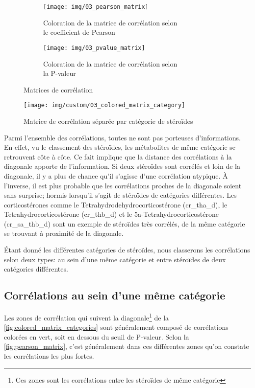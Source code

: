     \begin{figure}[H]
        \begin{subfigure}[b]{.5\textwidth}
            \centering
            \texttt{[image: img/03\_pearson\_matrix]}    
            \caption{Coloration de la matrice de corrélation selon\\ le coefficient de Pearson}
            \label{fig:pearson_matrix}
        \end{subfigure}
        \begin{subfigure}[b]{.5\textwidth}
            \centering
            \texttt{[image: img/03\_pvalue\_matrix]}    
            \caption{Coloration de la matrice de corrélation selon\\ la P-valeur}
            \label{fig:pvalue_matrix}
        \end{subfigure}
        \caption{Matrices de corrélation}
        \label{fig:correlation_matrices}
    \end{figure}

    \begin{figure}[H]
        \centering
        \texttt{[image: img/custom/03\_colored\_matrix\_category]}    
        \caption{Matrice de corrélation séparée par catégorie de stéroïdes}
        \label{fig:colored_matrix_categories}
    \end{figure}

    Parmi l'ensemble des corrélations, toutes ne sont pas porteuses d'informations. En effet, vu le classement des stéroïdes, les métabolites de même catégorie se retrouvent côte à côte. Ce fait implique que la distance des corrélations à la diagonale apporte de l'information. Si deux stéroïdes sont corrélés et loin de la diagonale, il y a plus de chance qu'il s'agisse d'une corrélation atypique. À l'inverse, il est plus probable que les corrélations proches de la diagonale soient sans surprise; hormis lorsqu'il s'agit de stéroïdes de catégories différentes. Les corticostérones comme le Tetrahydrodehydrocorticostérone (cr\_tha\_d), le Tetrahydrocorticostérone (cr\_thb\_d) et le 5a-Tetrahydrocorticostérone (cr\_sa\_thb\_d) sont un exemple de stéroïdes très corrélés, de la même catégorie se trouvant à proximité de la diagonale.

    Étant donné les différentes catégories de stéroïdes, nous classerons les corrélations selon deux types: au sein d'une même catégorie et entre stéroïdes de deux catégories différentes.

\subsection{Corrélations au sein d'une même catégorie}
    Les zones de corrélation qui suivent la diagonale\footnote{Ces zones sont les corrélations entre les stéroïdes de même catégorie} de la \autoref{fig:colored_matrix_categories} sont généralement composé de corrélations colorées en vert, soit en dessous du seuil de P-valeur. Selon la \autoref{fig:pearson_matrix}, c'est généralement dans ces différentes zones qu'on constate les corrélations les plus fortes.

